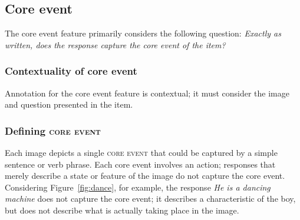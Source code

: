\documentclass[12pt]{article}
\newcommand{\feat}[1]{\textsc{#1}}
\begin{document}
\subsection{Core event} \label{subsec:core-event}
The core event feature primarily considers the following question: \textit{Exactly as written, does the response capture the core event of the item?}

\subsubsection{Contextuality of core event} Annotation for the core event feature is contextual; it must consider the image and question presented in the item. 

\subsubsection{Defining \feat{core event}}
Each image depicts a single \feat{core event} that could be captured by a simple sentence or verb phrase. Each core event involves an action; responses that merely describe a state or feature of the image do not capture the core event. Considering Figure~\ref{fig:dance}, for example, the response \textit{He is a dancing machine} does not capture the core event; it describes a characteristic of the boy, but does not describe what is actually taking place in the image.
\end{document}
